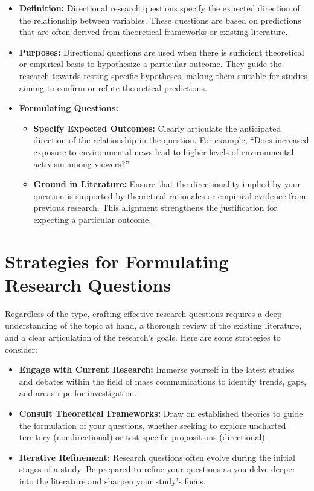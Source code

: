 \documentclass[
]{book}
\providecommand{\tightlist}{%
  \setlength{\itemsep}{0pt}\setlength{\parskip}{0pt}}
\begin{document}
\begin{itemize}
\item
  \textbf{Definition:} Directional research questions specify the expected direction of the relationship between variables. These questions are based on predictions that are often derived from theoretical frameworks or existing literature.
\item
  \textbf{Purposes:} Directional questions are used when there is sufficient theoretical or empirical basis to hypothesize a particular outcome. They guide the research towards testing specific hypotheses, making them suitable for studies aiming to confirm or refute theoretical predictions.
\item
  \textbf{Formulating Questions:}

  \begin{itemize}
  \tightlist
  \item
    \textbf{Specify Expected Outcomes:} Clearly articulate the anticipated direction of the relationship in the question. For example, ``Does increased exposure to environmental news lead to higher levels of environmental activism among viewers?''
  \item
    \textbf{Ground in Literature:} Ensure that the directionality implied by your question is supported by theoretical rationales or empirical evidence from previous research. This alignment strengthens the justification for expecting a particular outcome.
  \end{itemize}
\end{itemize}

\hypertarget{strategies-for-formulating-research-questions}{%
\section{Strategies for Formulating Research Questions}\label{strategies-for-formulating-research-questions}}

Regardless of the type, crafting effective research questions requires a deep understanding of the topic at hand, a thorough review of the existing literature, and a clear articulation of the research's goals. Here are some strategies to consider:

\begin{itemize}
\tightlist
\item
  \textbf{Engage with Current Research:} Immerse yourself in the latest studies and debates within the field of mass communications to identify trends, gaps, and areas ripe for investigation.
\item
  \textbf{Consult Theoretical Frameworks:} Draw on established theories to guide the formulation of your questions, whether seeking to explore uncharted territory (nondirectional) or test specific propositions (directional).
\item
  \textbf{Iterative Refinement:} Research questions often evolve during the initial stages of a study. Be prepared to refine your questions as you delve deeper into the literature and sharpen your study's focus.
\end{itemize}
\end{document}
